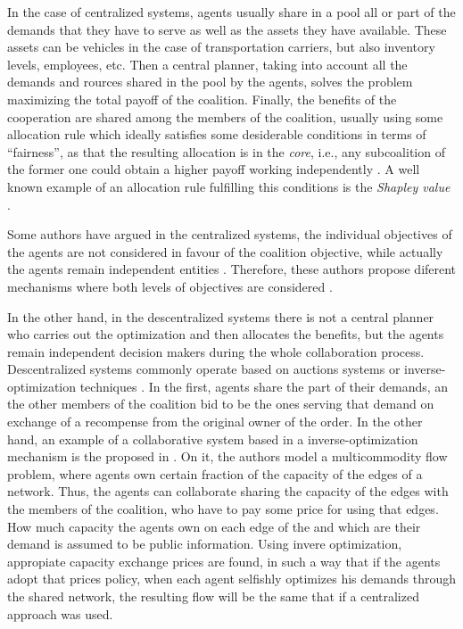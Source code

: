 \documentclass[review]{elsarticle}
\begin{document}
In the case of centralized systems, agents usually share in a pool all or
part of the demands that they have to serve as well as the assets they have
available. These assets can be vehicles in the case of transportation carriers,
but also inventory levels, employees, etc. Then a central planner, taking into
account all the demands and rources shared in the pool by the agents, solves the
problem maximizing the total payoff of the coalition. Finally, the benefits of
the cooperation are shared among the members of the coalition, usually using
some allocation rule which ideally satisfies some desiderable conditions in
terms of ``fairness'', as that the resulting allocation is in the \emph{core},
i.e., any subcoalition of the former one could obtain a higher payoff working
independently \cite{GONZALEZ2010}. A well known example of an allocation rule
fulfilling this conditions is the \emph{Shapley value} \cite{SHAPLEY1952}.

Some authors have argued in the centralized systems, the individual objectives
of the agents are not considered in favour of the coalition objective, while
actually the agents remain independent entities \cite{DEFRYN2018891}. Therefore,
these authors propose diferent mechanisms where both levels of objectives are
considered \cite{DEFRYN20191} \cite{VANOVERMEIRE2014125}.

In the other hand, in the descentralized systems there is not a central planner
who carries out the optimization and then allocates the benefits, but the agents
remain independent decision makers during the whole collaboration process.
Descentralized systems commonly operate based on auctions systems or
inverse-optimization techniques \cite{XIAOZHOU2013}. In the first, agents share
the part of their demands, an the other members of the coalition bid to be the
ones serving that demand on exchange of a recompense from the original owner of
the order. In the other hand, an example of a collaborative system based in a
inverse-optimization mechanism is the proposed in \cite{AGARWAL2008520}. On it,
the authors model a multicommodity flow problem, where agents own certain
fraction of the capacity of the edges of a network. Thus, the agents can
collaborate sharing the capacity of the edges with the members of the coalition,
who have to pay some price for using that edges. How much capacity the agents
own on each edge of the and which are their demand is assumed to be public
information. Using invere optimization, appropiate capacity exchange prices are
found, in such a way that if the agents adopt that prices policy, when each
agent selfishly optimizes his demands through the shared network, the resulting
flow will be the same that if a centralized approach was used. 
\end{document}
